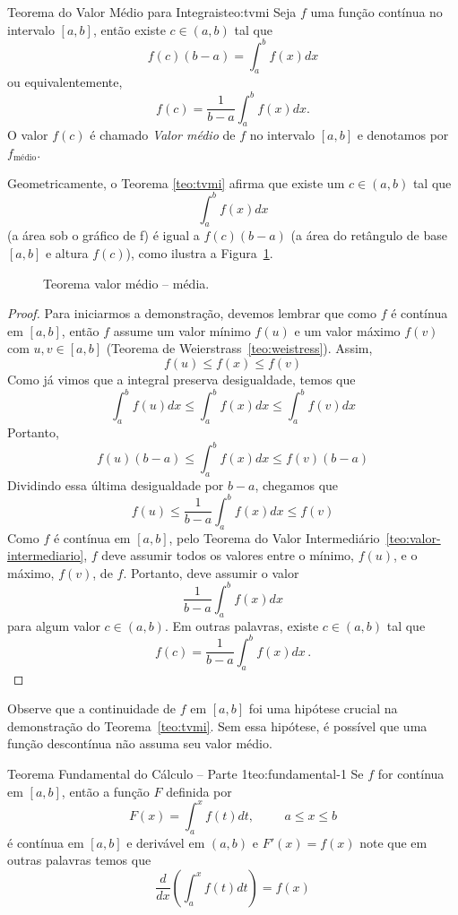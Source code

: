 \begin{teorema}{Teorema do Valor Médio para Integrais}{teo:tvmi}
  Seja $f$ uma função contínua no intervalo $[a, b]$, então existe $c \in (a, b)$
  tal que
  \[
      f(c)(b-a)= \int_a^b f(x)dx
  \]
  ou equivalentemente,
  \[
      f(c)= \frac{1}{b-a}\int_a^b f(x)dx.
  \]
  O valor $f(c)$ é chamado \textit{Valor médio} de $f$ no intervalo $[a, b]$
  e denotamos por~$f_{\text{médio}}$.
\end{teorema}

Geometricamente, o Teorema \ref{teo:tvmi} afirma que existe um $c \in (a, b)$
tal que
\[
  \int_a^bf(x) dx
\]
(a área sob o gráfico de f) é igual a
$f(c) (b-a)$ (a área do retângulo de base $[a, b]$ e altura $f(c)$),
como ilustra a Figura~\ref{fig:valormedio_media}.

\begin{figure}
   \centering
   
   \caption{Teorema valor médio -- média.}
   \label{fig:valormedio_media}
\end{figure}

\begin{proof}
  Para iniciarmos a demonstração, devemos lembrar que como $f$ é contínua em
  $[a, b]$, então $f$ assume um
  valor mínimo $f(u)$ e um
  valor máximo $f(v)$ com $u, v \in [a, b]$
  (Teorema de Weierstrass~\ref{teo:weistress}).
  Assim,
  \[
    f(u) \leq f(x) \leq f(v)
  \]
  Como já vimos que a integral preserva desigualdade, temos que
  \[
    \int_a^b f(u) dx \leq \int_a^b f(x) dx\leq \int_a^b f(v) dx
  \]
  Portanto,
  \[
    f(u)(b-a) \leq \int_a^b f(x) dx \leq f(v)(b-a)
  \]
  Dividindo essa última desigualdade por $b-a$, chegamos que
  \[
    f(u) \leq \frac{1}{b-a}\int_a^b f(x)dx \leq f(v)
  \]
  Como $f$ é contínua em $[a, b]$, pelo Teorema do Valor
  Intermediário~\ref{teo:valor-intermediario}, $f$ deve assumir
  todos os valores entre o mínimo, $f(u)$, e o máximo, $f(v)$,
  de $f$. Portanto, deve assumir o valor
  \[
    \frac{1}{b-a}\int_a^b f(x)dx
  \]
  para algum valor $c \in (a, b)$. Em outras palavras, existe
  $c \in (a, b)$ tal que
  \[
    f(c)= \frac{1}{b-a}\int_a^b f(x)dx \,.
  \]
\end{proof}

Observe que a continuidade de $f$ em $[a, b]$ foi uma hipótese crucial na
demonstração do Teorema~\ref{teo:tvmi}. Sem essa hipótese, é possível que
uma função descontínua não assuma seu valor médio.

\begin{teorema}{Teorema Fundamental do Cálculo -- Parte 1}{teo:fundamental-1}
  Se $f$ for contínua em $[a, b]$, então a função $F$ definida por
  \[
    F(x)= \int_a^x f(t)dt, \hspace{1cm} a \leq x \leq b
  \]
  é contínua em $[a, b]$ e derivável em $(a, b)$ e $F'(x)=f(x)$
  note que em outras palavras temos que
  \[
    \frac{d}{dx} \left( \int_a^x f(t)dt \right)=f(x)
  \]
\end{teorema}

